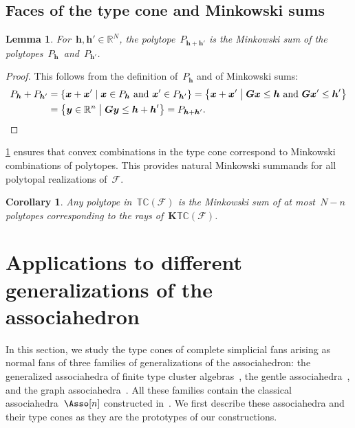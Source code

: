 \documentclass{amsart}
\newtheorem{corollary}[theorem]{Corollary}
\newtheorem{lemma}[theorem]{Lemma}
\theoremstyle{definition}
\newcommand{\R}{\mathbb{R}} %
\renewcommand{\b}[1]{{\boldsymbol{#1}}} %
\newcommand{\set}[2]{\left\{ #1 \;\middle|\; #2 \right\}} %
\newcommand{\Fan}{\mathcal{F}} %
\newcommand{\typeCone}{\mathbb{TC}} %
\begin{document}
\subsection{Faces of the type cone and Minkowski sums}

\begin{lemma}
\label{lem:MinkowskiSum}
For~$\b{h}, \b{h}' \! \in \R^N$, the polytope~$P_{\b{h} + \b{h'}}$ is the Minkowski sum of the polytopes~$P_\b{h}$~and~$P_{\b{h}'}$.
\end{lemma}

\begin{proof}
This follows from the definition of~$P_\b{h}$ and of Minkowski sums:
\begin{align*}
P_\b{h} + P_{\b{h}'} & = \set{\b{x} + \b{x}'}{\b{x} \in P_\b{h} \text{ and } \b{x}' \in P_{\b{h}'}} = \set{\b{x} + \b{x}'}{\b{G}\b{x} \le \b{h} \text{ and } \b{G}\b{x}' \le \b{h}'} \\
& = \set{\b{y} \in \R^n}{\b{G}\b{y} \le \b{h} + \b{h}'} = P_{\b{h} + \b{h}'}.
\qedhere
\end{align*}
\end{proof}

\cref{lem:MinkowskiSum} ensures that convex combinations in the type cone correspond to Minkowski combinations of polytopes. This provides natural Minkowski summands for all polytopal realizations of~$\Fan$.

\begin{corollary}
Any polytope in~$\typeCone(\Fan)$ is the Minkowski sum of at most~$N-n$ polytopes corresponding to the rays of~$\b{K}\typeCone(\Fan)$.
\end{corollary}


\section{Applications to different generalizations of the associahedron}
\label{sec:applications}

In this section, we study the type cones of complete simplicial fans arising as normal fans of three families of generalizations of the associahedron: the generalized associahedra of finite type cluster algebras~\cite{FominZelevinsky-ClusterAlgebrasI, FominZelevinsky-ClusterAlgebrasII, FominZelevinsky-ClusterAlgebrasIV, HohlwegLangeThomas}, the gentle associahedra~\cite{PaluPilaudPlamondon-nonkissing}, and the graph associahedra~\cite{CarrDevadoss, Postnikov, FeichtnerSturmfels, Zelevinsky}. 
All these families contain the classical associahedra~$\Asso[n]$ constructed in~\cite{ShniderSternberg, Loday}.
We first describe these associahedra and their type cones as they are the prototypes of our constructions.
\end{document}

